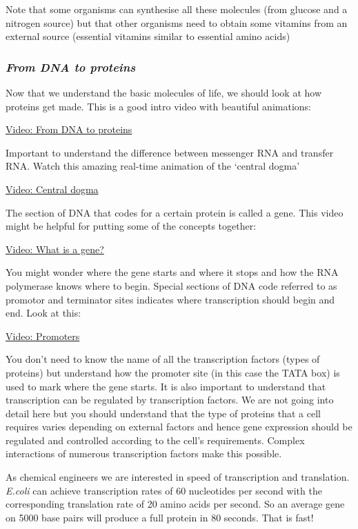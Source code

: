 \documentclass[11pt]{article}
\begin{document}
Note that some organisms can synthesise all these molecules (from
glucose and a nitrogen source) but that other organisms need to obtain
some vitamins from an external source (essential vitamins similar to
essential amino acids)

    \subsubsection{\texorpdfstring{\emph{From DNA to
proteins}}{From DNA to proteins}}\label{from-dna-to-proteins}

Now that we understand the basic molecules of life, we should look at
how proteins get made. This is a good intro video with beautiful
animations:

\href{https://www.youtube.com/watch?v=gG7uCskUOrA}{Video: From DNA to
proteins}

Important to understand the difference between messenger RNA and
transfer RNA. Watch this amazing real-time animation of the `central
dogma'

\href{https://www.youtube.com/watch?v=D3fOXt4MrOM}{Video: Central dogma}

The section of DNA that codes for a certain protein is called a gene.
This video might be helpful for putting some of the concepts together:

\href{https://www.youtube.com/watch?v=5MQdXjRPHmQ}{Video: What is a
gene?}

You might wonder where the gene starts and where it stops and how the
RNA polymerase knows where to begin. Special sections of DNA code
referred to as promotor and terminator sites indicates where
transcription should begin and end. Look at this:

\href{https://www.youtube.com/watch?v=JtwMBD7tSGg}{Video: Promoters}

You don't need to know the name of all the transcription factors (types
of proteins) but understand how the promoter site (in this case the TATA
box) is used to mark where the gene starts. It is also important to
understand that transcription can be regulated by transcription factors.
We are not going into detail here but you should understand that the
type of proteins that a cell requires varies depending on external
factors and hence gene expression should be regulated and controlled
according to the cell's requirements. Complex interactions of numerous
transcription factors make this possible.

As chemical engineers we are interested in speed of transcription and
translation. \emph{E.coli} can achieve transcription rates of 60
nucleotides per second with the corresponding translation rate of 20
amino acids per second. So an average gene on 5000 base pairs will
produce a full protein in 80 seconds. That is fast!
\end{document}
